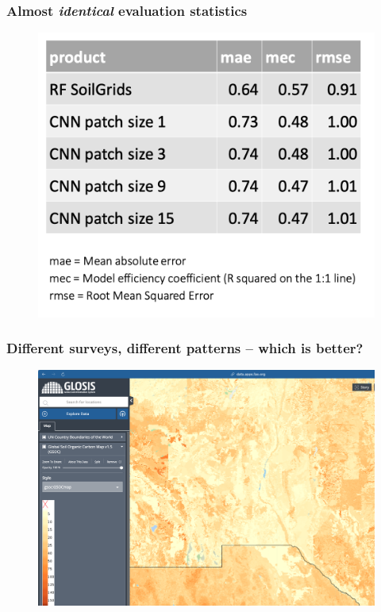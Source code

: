 \documentclass[aspectratio=169, 10pt]{beamer}
\begin{document}
\begin{frame}
  \frametitle{Almost \emph{identical} evaluation statistics}
    \begin{figure}
        \centering
\includegraphics[height=0.7\textheight]{./graphics_david/Genova_poster_stats.png}
\end{figure}
\end{frame}


\begin{frame}
  \frametitle{Different surveys, different patterns -- which is better?}
    \begin{figure}
        \centering
        \includegraphics[height=0.6\textheight]{./graphics_david/GLOSIS_SOC_LasCrucesRegion.png}
     \end{figure} 
\end{frame}
\end{document}
